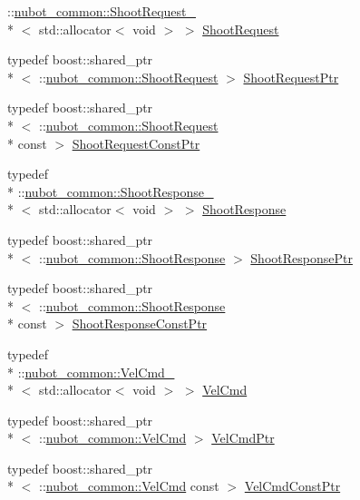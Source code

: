 \begin{DoxyCompactItemize}
\-::\hyperlink{structnubot__common_1_1ShootRequest__}{nubot\-\_\-common\-::\-Shoot\-Request\-\_\-}\\*
$<$ std\-::allocator$<$ void $>$ $>$ \hyperlink{namespacenubot__common_ab115c969a87ffc5940d2f26488a5baa3}{Shoot\-Request}
\item 
typedef boost\-::shared\-\_\-ptr\\*
$<$ \-::\hyperlink{namespacenubot__common_ab115c969a87ffc5940d2f26488a5baa3}{nubot\-\_\-common\-::\-Shoot\-Request} $>$ \hyperlink{namespacenubot__common_aab5a1233cee5cd37a060be382351f99d}{Shoot\-Request\-Ptr}
\item 
typedef boost\-::shared\-\_\-ptr\\*
$<$ \-::\hyperlink{namespacenubot__common_ab115c969a87ffc5940d2f26488a5baa3}{nubot\-\_\-common\-::\-Shoot\-Request} \\*
const  $>$ \hyperlink{namespacenubot__common_af6ec3e639ec8410eff9da8b559df3952}{Shoot\-Request\-Const\-Ptr}
\item 
typedef \\*
\-::\hyperlink{structnubot__common_1_1ShootResponse__}{nubot\-\_\-common\-::\-Shoot\-Response\-\_\-}\\*
$<$ std\-::allocator$<$ void $>$ $>$ \hyperlink{namespacenubot__common_a7fc7346cebf4ea3bdbc7c25438d3959e}{Shoot\-Response}
\item 
typedef boost\-::shared\-\_\-ptr\\*
$<$ \-::\hyperlink{namespacenubot__common_a7fc7346cebf4ea3bdbc7c25438d3959e}{nubot\-\_\-common\-::\-Shoot\-Response} $>$ \hyperlink{namespacenubot__common_aead2ba57f157347012f6575c18c422d2}{Shoot\-Response\-Ptr}
\item 
typedef boost\-::shared\-\_\-ptr\\*
$<$ \-::\hyperlink{namespacenubot__common_a7fc7346cebf4ea3bdbc7c25438d3959e}{nubot\-\_\-common\-::\-Shoot\-Response} \\*
const  $>$ \hyperlink{namespacenubot__common_aacaf2fc964aa85e0b87fd5721490e203}{Shoot\-Response\-Const\-Ptr}
\item 
typedef \\*
\-::\hyperlink{structnubot__common_1_1VelCmd__}{nubot\-\_\-common\-::\-Vel\-Cmd\-\_\-}\\*
$<$ std\-::allocator$<$ void $>$ $>$ \hyperlink{namespacenubot__common_acc00f78d81bb67c28f6b4aaf38c2c884}{Vel\-Cmd}
\item 
typedef boost\-::shared\-\_\-ptr\\*
$<$ \-::\hyperlink{namespacenubot__common_acc00f78d81bb67c28f6b4aaf38c2c884}{nubot\-\_\-common\-::\-Vel\-Cmd} $>$ \hyperlink{namespacenubot__common_a1bad07d199495dad168c627253bbf1ec}{Vel\-Cmd\-Ptr}
\item 
typedef boost\-::shared\-\_\-ptr\\*
$<$ \-::\hyperlink{namespacenubot__common_acc00f78d81bb67c28f6b4aaf38c2c884}{nubot\-\_\-common\-::\-Vel\-Cmd} const  $>$ \hyperlink{namespacenubot__common_a432df2503deef33e00a5aa25b43c3d05}{Vel\-Cmd\-Const\-Ptr}
\end{DoxyCompactItemize}
